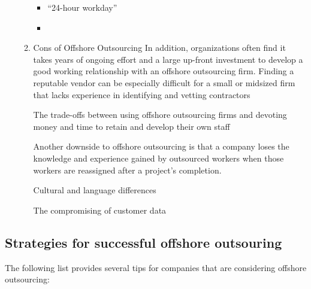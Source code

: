 \documentclass[11pt]{article}
\begin{document}
\begin{enumerate}
\begin{enumerate}
\begin{itemize}
\item “24-hour workday”
\item 
\end{itemize}
\item Cons of Offshore Outsourcing
\label{sec:org2b64d76}
In addition, organizations often find it takes years of ongoing effort and a large up-front investment to develop a good working relationship with an offshore outsourcing firm. Finding a reputable vendor can be especially difficult for a small or midsized firm that lacks experience in identifying and vetting contractors


The trade-offs between using offshore outsourcing firms and devoting money and time to retain and develop their own staff

Another downside to offshore outsourcing is that a company loses the knowledge and experience gained by outsourced workers when those workers are reassigned after a project’s completion.

Cultural and language differences

The compromising of customer data
\end{enumerate}
\end{enumerate}
\subsection{Strategies for successful offshore outsouring}
\label{sec:orgef13d6f}
The following list provides several tips for companies that are considering offshore
outsourcing:
\end{document}
